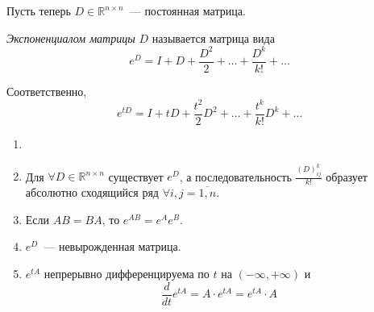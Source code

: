 Пусть теперь $D \in \mathbb{R}^{n \times n}$~--- постоянная матрица.

\begin{defn}
    \textit{Экспоненциалом матрицы} $D$ называется матрица вида
    \begin{equation*}
        e^{D} = I + D + \frac{D^2}{2} + \ldots + \frac{D^k}{k!} + \ldots
    \end{equation*}

    Соответственно, 
    \begin{equation*}
        e^{tD} = I + tD + \frac{t^2}{2} D^2 + \ldots + \frac{t^k}{k!} D^k + \ldots 
    \end{equation*}
\end{defn}

\begin{namedthm}
    \begin{enumerate}
        \item[]
        \item Для $\forall D \in \mathbb{R}^{n \times n}$ существует $ e^{D}$, а последовательность $\frac{(D)^k_{ij}}{k!}$ образует абсолютно сходящийся ряд $\forall i, j = \overline{1, n}$.
        \item Если $AB = BA$, то $e^{AB} = e^{A} e^{B}$.
        \item $e^D$~--- невырожденная матрица.
        \item $e^{tA}$ непрерывно дифференцируема по $t$ на $(-\infty, +\infty)$ и 
        \begin{equation*}
            \frac{d}{dt} e^{tA} = A \cdot e^{tA} = e^{tA} \cdot A
        \end{equation*}
    \end{enumerate}
\end{namedthm}

